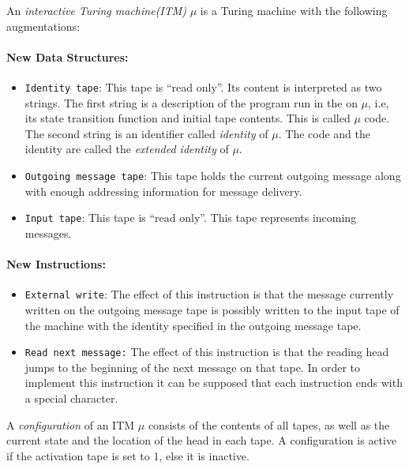 \documentclass[..]{subfiles}
\begin{document}
\begin{definition}
	\normalfont
	An \textit{interactive Turing machine(ITM)} $\mu$ is a Turing machine with the following augmentations:
	\paragraph{New Data Structures:}
	\begin{itemize}
		\item \texttt{Identity tape}: This tape is ``read only''. Its content is interpreted as two strings. The first string is a description of the program run in the on $\mu$, i.e, its state transition function and initial tape contents. This is called $\mu$ code. The second string is an identifier called \textit{identity} of $\mu$. The code and the identity are called the \textit{extended identity} of $\mu$.

		\item \texttt{Outgoing message tape}: This tape holds the current outgoing message along with enough addressing information for message delivery.

		\item \texttt{Input tape}: This tape is ``read only''. This tape represents incoming messages. 
	\end{itemize}

	\paragraph{New Instructions:}
	\begin{itemize}
		\item \texttt{External write}: The effect of this instruction is that the message currently written on the outgoing message tape is possibly written to the input tape of the machine with the identity specified in the outgoing message tape.
		\item \texttt{Read next message:} The effect of this instruction is that the reading head jumps to the beginning of the next message on that tape. In order to implement this instruction it can be supposed that each instruction ends with a special character.
	\end{itemize}
\end{definition}

\begin{definition}
	\normalfont
	A \textit{configuration} of an ITM $\mu$ consists of the contents of all tapes, as well as the current state and the location of the head in each tape. A configuration is active if the activation tape is set to 1, else it is inactive.
\end{definition}
\end{document}
